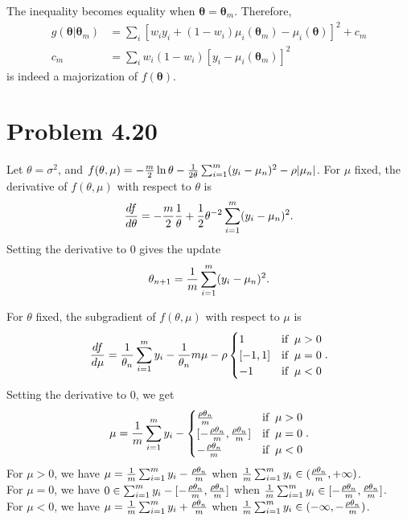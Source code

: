 \documentclass{scrartcl}
\begin{document}
The inequality becomes equality when $\pmb{\theta} = \pmb{\theta}_m$. Therefore,
\begin{equation}
\begin{split}
g(\pmb{\theta} | \pmb{\theta}_m)
& = \sum_i [w_i y_i + (1-w_i) \mu_i(\pmb{\theta}_m)-\mu_i(\pmb{\theta})]^2+c_m \\
c_m & = \sum_i w_i (1-w_i) [y_i - \mu_i(\pmb{\theta}_m)]^2
\end{split}
\end{equation}
is indeed a majorization of $f(\pmb{\theta})$.

\section*{Problem 4.20}

Let $\theta = \sigma^2$, and
$f(\theta, \mu) = -{m \over 2} \ln \theta
- {1 \over {2\theta}} \sum_{i=1}^m (y_i - \mu_n)^2 - \rho |\mu_n|$.
For $\mu$ fixed, the derivative of $f(\theta, \mu)$ with respect to $\theta$ is
\begin{equation}
{d f \over d \theta}
= -{m \over 2} {1 \over \theta}
+ {1 \over 2} \theta^{-2} \sum_{i=1}^m(y_i-\mu_n)^2.
\end{equation}
Setting the derivative to 0 gives the update
\begin{equation}
\theta_{n+1} = {1 \over m} \sum_{i=1}^m (y_i - \mu_n)^2.
\end{equation}

For $\theta$ fixed, the subgradient of $f(\theta, \mu)$ with respect to $\mu$ is
\begin{equation}
{d f \over d \mu} = {1 \over \theta_n} \sum_{i=1}^m y_i - {1 \over \theta_n} m \mu - \rho
\begin{cases}
	1 & \text{if\;\;} \mu > 0 \\
	[-1, 1] & \text{if\;\;} \mu = 0 \\
	-1 & \text{if\;\;} \mu < 0
\end{cases}.
\end{equation}
Setting the derivative to 0, we get
\begin{equation}
\mu = {1 \over m} \sum_{i=1}^m y_i -
\begin{cases}
	{\rho \theta_n \over m} & \text{if\;\;} \mu > 0 \\
	[-{\rho \theta_n \over m}, {\rho \theta_n \over m}] & \text{if\;\;} \mu = 0 \\
	-{\rho \theta_n \over m} & \text{if\;\;} \mu < 0
\end{cases}.
\end{equation}
For $\mu > 0$, we have
$\mu = {1 \over m} \sum_{i=1}^m y_i - {\rho \theta_n \over m}$
when ${1 \over m} \sum_{i=1}^m y_i \in ({\rho \theta_n \over m}, +\infty)$. \\
For $\mu = 0$, we have $0 \in \sum_{i=1}^m y_i - [-{\rho \theta_n \over m}, {\rho \theta_n \over m}]$
when ${1 \over m}\sum_{i=1}^m y_i \in [-{\rho \theta_n \over m}, {\rho \theta_n \over m}]$. \\
For $\mu < 0$, we have
$\mu = {1 \over m} \sum_{i=1}^m y_i + {\rho \theta_n \over m}$
when ${1 \over m} \sum_{i=1}^m y_i \in (-\infty, -{\rho \theta_n \over m})$.
\end{document}
